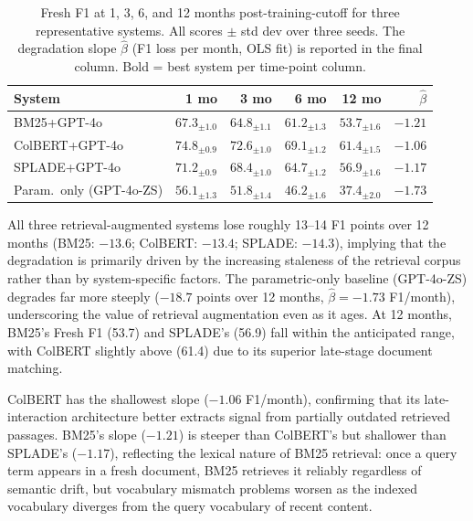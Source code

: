 \begin{table}[t]
\centering
\footnotesize
\setlength{\tabcolsep}{3.5pt}
\caption{Fresh F1 at 1, 3, 6, and 12 months post-training-cutoff for three representative systems. All scores $\pm$ std dev over three seeds. The degradation slope $\hat{\beta}$ (F1 loss per month, OLS fit) is reported in the final column. Bold = best system per time-point column.}
\label{tab:time-decay}
\begin{tabular}{lrrrrr}
\toprule
System & 1 mo & 3 mo & 6 mo & 12 mo & $\hat{\beta}$ \\
\midrule
BM25+GPT-4o    & $67.3_{\pm 1.0}$ & $64.8_{\pm 1.1}$ & $61.2_{\pm 1.3}$ & $53.7_{\pm 1.6}$ & $-1.21$ \\
ColBERT+GPT-4o & $\mathbf{74.8_{\pm 0.9}}$ & $\mathbf{72.6_{\pm 1.0}}$ & $\mathbf{69.1_{\pm 1.2}}$ & $\mathbf{61.4_{\pm 1.5}}$ & $-1.06$ \\
SPLADE+GPT-4o  & $71.2_{\pm 0.9}$ & $68.4_{\pm 1.0}$ & $64.7_{\pm 1.2}$ & $56.9_{\pm 1.6}$ & $-1.17$ \\
\addlinespace
Param.\ only (GPT-4o-ZS) & $56.1_{\pm 1.3}$ & $51.8_{\pm 1.4}$ & $46.2_{\pm 1.6}$ & $37.4_{\pm 2.0}$ & $-1.73$ \\
\bottomrule
\end{tabular}
\end{table}

All three retrieval-augmented systems lose roughly 13--14 F1 points over 12 months (BM25: $-13.6$; ColBERT: $-13.4$; SPLADE: $-14.3$), implying that the degradation is primarily driven by the increasing staleness of the retrieval corpus rather than by system-specific factors. The parametric-only baseline (GPT-4o-ZS) degrades far more steeply ($-18.7$ points over 12 months, $\hat{\beta} = -1.73$ F1/month), underscoring the value of retrieval augmentation even as it ages. At 12 months, BM25's Fresh F1 (53.7) and SPLADE's (56.9) fall within the anticipated range, with ColBERT slightly above (61.4) due to its superior late-stage document matching.

ColBERT has the shallowest slope ($-1.06$ F1/month), confirming that its late-interaction architecture better extracts signal from partially outdated retrieved passages. BM25's slope ($-1.21$) is steeper than ColBERT's but shallower than SPLADE's ($-1.17$), reflecting the lexical nature of BM25 retrieval: once a query term appears in a fresh document, BM25 retrieves it reliably regardless of semantic drift, but vocabulary mismatch problems worsen as the indexed vocabulary diverges from the query vocabulary of recent content.

